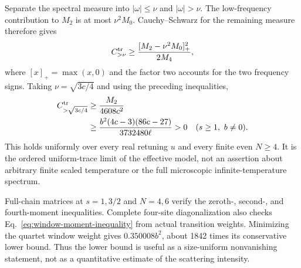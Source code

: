Separate the spectral measure into $|\omega|\le\nu$ and
$|\omega|>\nu$. The low-frequency contribution to $M_2$ is at most
$\nu^2M_0$. Cauchy--Schwarz for the remaining measure therefore gives
\begin{equation}
 C^{\rm tr}_{>\nu}\ge
 \frac{[M_2-\nu^2M_0]_+^2}{2M_4},
 \label{eq:window-moment-inequality}
\end{equation}
where $[x]_+=\max(x,0)$ and the factor two accounts for the two frequency
signs. Taking $\nu=\sqrt{3c/4}$ and using the preceding inequalities,
\begin{align}
 C^{\rm tr}_{>\sqrt{3c/4}}
 &\ge\frac{M_2}{4608c^2}\notag\\
 &\ge\frac{b^2(4c-3)(86c-27)}{3732480\ell}>0
 \quad(s\ge1,\ b\ne0).
 \label{eq:general-window-bound}
\end{align}
This holds uniformly over every real retuning $u$ and every finite even
$N\ge4$. It is the ordered uniform-trace limit of the effective model,
not an assertion about arbitrary finite scaled temperature or the full
microscopic infinite-temperature spectrum.

Full-chain matrices at $s=1,3/2$ and $N=4,6$ verify the zeroth-, second-,
and fourth-moment inequalities. Complete four-site diagonalization also
checks Eq.~\eqref{eq:window-moment-inequality} from actual transition
weights. Minimizing the quartet window weight gives $0.350008b^2$,
about 1842 times its conservative lower bound. Thus the lower bound is
useful as a size-uniform nonvanishing statement, not as a quantitative
estimate of the scattering intensity.
